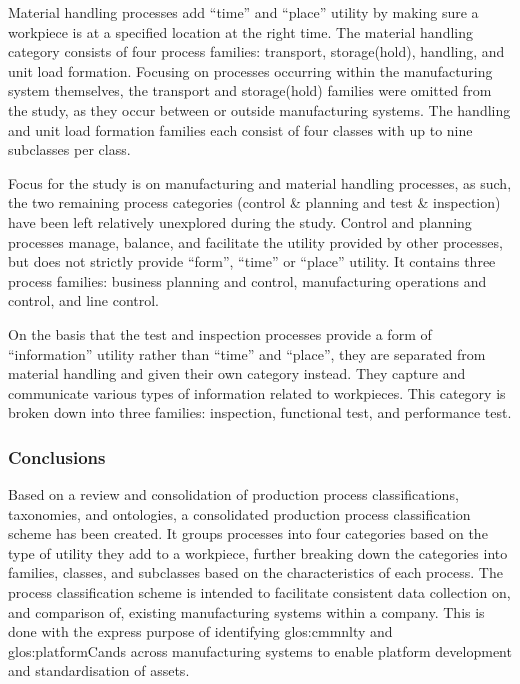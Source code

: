 Material handling processes add ``time'' and ``place'' utility by making sure a workpiece is at a specified location at the right time.
The material handling category consists of four process families: transport, storage(hold), handling, and unit load formation.
Focusing on processes occurring within the manufacturing system themselves, the transport and storage(hold) families were omitted from the study, as they occur between or outside manufacturing systems.
The handling and unit load formation families each consist of four classes with up to nine subclasses per class.

Focus for the study is on manufacturing and material handling processes, as such, the two remaining process categories (control \& planning and test \& inspection) have been left relatively unexplored during the study.
Control and planning processes manage, balance, and facilitate the utility provided by other processes, but does not strictly provide ``form'', ``time'' or ``place'' utility.
It contains three process families: business planning and control, manufacturing operations and control, and line control.

On the basis that the test and inspection processes provide a form of ``information'' utility rather than ``time'' and ``place'', they are separated from material handling and given their own category instead.
They capture and communicate various types of information related to workpieces.
This category is broken down into three families: inspection, functional test, and performance test.

\subsubsection*{Conclusions}
Based on a review and consolidation of production process classifications, taxonomies, and ontologies, a consolidated production process classification scheme has been created.
It groups processes into four categories based on the type of utility they add to a workpiece, further breaking down the categories into families, classes, and subclasses based on the characteristics of each process.
The process classification scheme is intended to facilitate consistent data collection on, and comparison of, existing manufacturing systems within a company.
This is done with the express purpose of identifying \gls{glos:cmmnlty} and \gls{glos:platformCand}s across manufacturing systems to enable platform development and standardisation of assets.

